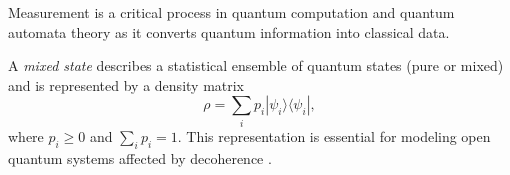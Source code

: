 \begin{observation}
Measurement is a critical process in quantum computation and quantum automata theory as it converts quantum information into classical data.
\end{observation}

\begin{definition}
    A \emph{mixed state} describes a statistical ensemble of quantum states (pure or mixed) and is represented by a density matrix
    \[
    \rho = \sum_i p_i |\psi_i\rangle \langle\psi_i|,
    \]
    where \(p_i \ge 0\) and \(\sum_i p_i = 1\). This representation is essential for modeling open quantum systems affected by decoherence \cite{nielsen2010quantum}.
\end{definition}